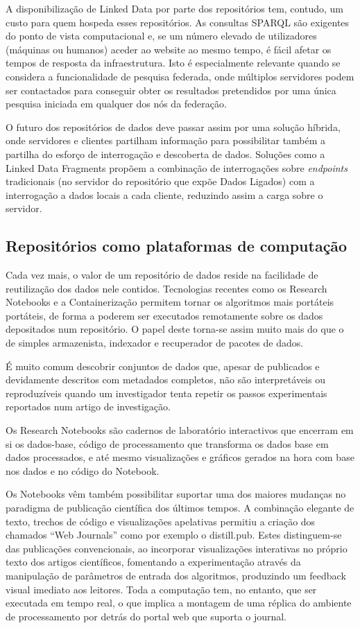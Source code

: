 \documentclass[sigconf,nonacm]{acmart}
\begin{document}
A disponibilização de Linked Data por parte dos repositórios tem, contudo, um custo para quem hospeda esses repositórios. As consultas SPARQL são exigentes do ponto de vista computacional e, se um número elevado de utilizadores (máquinas ou humanos) aceder ao website ao mesmo tempo, é fácil afetar os tempos de resposta da infraestrutura. Isto é especialmente relevante quando se considera a funcionalidade de pesquisa federada, onde múltiplos servidores podem ser contactados para conseguir obter os resultados pretendidos por uma única pesquisa iniciada em qualquer dos nós da federação.

O futuro dos repositórios de dados deve passar assim por uma solução híbrida, onde servidores e clientes partilham informação para possibilitar também a partilha do esforço de interrogação e descoberta de dados. Soluções como a Linked Data Fragments\cite{VERBORGH2016184} propõem a combinação de interrogações sobre \textit{endpoints} tradicionais (no servidor do repositório que expõe Dados Ligados) com a interrogação a dados locais a cada cliente, reduzindo assim a carga sobre o servidor.

\subsection{Repositórios como plataformas de computação}

Cada vez mais, o valor de um repositório de dados reside na facilidade de reutilização dos dados nele contidos. Tecnologias recentes como os Research Notebooks e a Containerização permitem tornar os algoritmos mais portáteis portáteis, de forma a poderem ser executados remotamente sobre os dados depositados num repositório. O papel deste torna-se assim muito mais do que o de simples armazenista, indexador e recuperador de pacotes de dados.

É muito comum descobrir conjuntos de dados que, apesar de publicados e devidamente descritos com metadados completos, não são interpretáveis ou reproduzíveis quando um investigador tenta repetir os passos experimentais reportados num artigo de investigação\cite{}. 

Os Research Notebooks são cadernos de laboratório interactivos que encerram em si os dados-base, código de processamento que transforma os dados base em dados processados, e até mesmo visualizações e gráficos gerados na hora com base nos dados e no código do Notebook.

Os Notebooks vêm também possibilitar suportar uma dos maiores mudanças no paradigma de publicação científica dos últimos tempos. A combinação elegante de texto, trechos de código e visualizações apelativas permitiu a criação dos chamados ``Web Journals'' como por exemplo o distill.pub. Estes distinguem-se das publicações convencionais, ao incorporar visualizações interativas no próprio texto dos artigos científicos, fomentando a experimentação através da manipulação de parâmetros de entrada dos algoritmos, produzindo um feedback visual imediato aos leitores. Toda a computação tem, no entanto, que ser executada em tempo real, o que implica a montagem de uma réplica do ambiente de processamento por detrás do portal web que suporta o journal.
\end{document}
